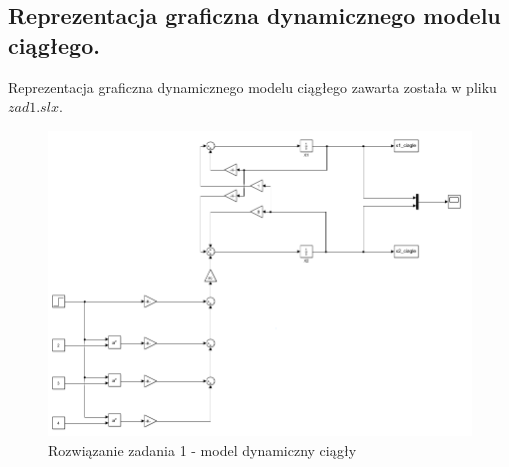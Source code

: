 \subsection{Reprezentacja graficzna dynamicznego modelu ciągłego.}
Reprezentacja graficzna dynamicznego modelu ciągłego zawarta została w pliku $zad1.slx$.
\begin{figure}[H]
\centering
\includegraphics[width=15cm]{images/zad1.png}
\caption{Rozwiązanie zadania 1 - model dynamiczny ciągły}
\label{fig:zad2}
\end{figure}
